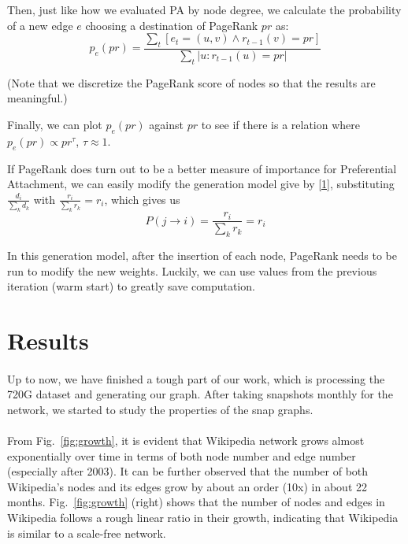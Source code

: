 \documentclass[10pt]{article}
\begin{document}
\begin{multicols}{2}
Then, just like how we evaluated PA by node degree, we calculate the probability of a new edge $e$ choosing a destination of PageRank $pr$ as:
\begin{equation}
\label{4}
p_e(pr)=\frac{\sum\limits_{t}[e_t=(u,v)\wedge r_{t-1}(v)=pr]}{\sum\limits_{t}|u:r_{t-1}(u)=pr|}
\end{equation}

(Note that we discretize the PageRank score of nodes so that the results are meaningful.)

Finally, we can plot $p_e(pr)$ against $pr$ to see if there is a relation where $p_e(pr)\propto pr^\tau$, $\tau \approx 1$.

If PageRank does turn out to be a better measure of importance for Preferential Attachment, we can easily modify the generation model give by \eqref{1}, substituting $\frac{d_i}{\sum\limits_{k}d_k}$ with $\frac{r_i}{\sum\limits_{k}r_k}=r_i$, which gives us
\begin{equation}
\label{5}
P(j\rightarrow i)=\frac{r_i}{\sum\limits_{k}r_k}=r_i
\end{equation}

In this generation model, after the insertion of each node, PageRank needs to be run to modify the new weights. Luckily, we can use values from the previous iteration (warm start) to greatly save computation.

\section{Results}
\paragraph{}Up to now, we have finished a tough part of our work, which is processing the 720G dataset and generating our graph. After taking snapshots monthly for the network, we started to study the properties of the snap graphs.

\paragraph{}From Fig.~\ref{fig:growth}, it is evident that Wikipedia network grows almost exponentially over time in terms of both node number and edge number (especially after 2003). It can be further observed that the number of both Wikipedia's nodes and its edges grow by about an order (10x) in about 22 months. Fig.~\ref{fig:growth} (right) shows that the number of nodes and edges in Wikipedia follows a rough linear ratio in their growth, indicating that Wikipedia is similar to a scale-free network. 


\end{multicols}
\end{document}
